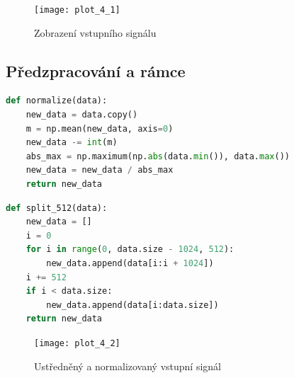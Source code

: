 \documentclass{article}
\begin{document}
\begin{figure}[ht]
    \texttt{[image: plot\_4\_1]}
    \caption{Zobrazení vstupního signálu}
\end{figure}

\newpage


\subsection{Předzpracování a rámce}
\begin{lstlisting}[language=Python, caption={Ustřednění signálu a jeho normalizování do dynamického rozsahu}]
def normalize(data):
    new_data = data.copy()
    m = np.mean(new_data, axis=0)
    new_data -= int(m)
    abs_max = np.maximum(np.abs(data.min()), data.max())
    new_data = new_data / abs_max
    return new_data
\end{lstlisting}

\begin{lstlisting}[language=Python, caption={Rozdělení na rámce o velikosti 1024 vzorků s překrytím 512 vzorků}]
def split_512(data):
    new_data = []
    i = 0
    for i in range(0, data.size - 1024, 512):
        new_data.append(data[i:i + 1024])
    i += 512
    if i < data.size:
        new_data.append(data[i:data.size])
    return new_data
\end{lstlisting}

\begin{figure}[ht]
    \texttt{[image: plot\_4\_2]}
    \caption{Ustředněný a normalizovaný vstupní signál}
\end{figure}

\newpage
\end{document}
